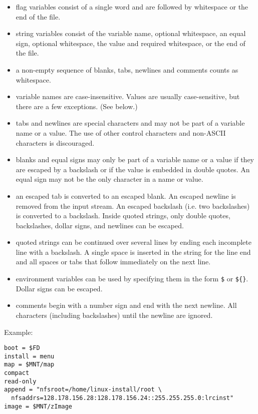 \begin{itemize}
  \item flag variables consist of a single word and are followed by
    whitespace or the end of the file.
  \item string variables consist of the variable name, optional whitespace,
    an equal sign, optional whitespace, the value and required whitespace,
    or the end of the file.
  \item a non-empty sequence of blanks, tabs, newlines and comments counts
    as whitespace.
  \item variable names are case-insensitive. Values are usually case-sensitive,
    but there are a few exceptions. (See below.)
  \item tabs and newlines are special characters and may not be part of a
    variable name or a value. The use of other control characters and
    non-ASCII characters is discouraged.
  \item blanks and equal signs may only be part of a variable name or a
    value if they are escaped by a backslash or if the value is embedded in
    double quotes. An equal sign may not be the only character in a name or
    value.
  \item an escaped tab is converted to an escaped blank. An escaped newline
    is removed from the input stream. An escaped backslash (i.e. two
    backslashes) is converted to a backslash. Inside quoted strings, only
    double quotes, backslashes, dollar signs, and newlines can be escaped.
  \item quoted strings can be continued over several lines by ending each
    incomplete line with a backslash. A single space is inserted in the
    string for the line end and all spaces or tabs that follow immediately
    on the next line.
  \item environment variables can be used by specifying them in the form
    \verb"$" or \verb"${"\verb"}". Dollar signs can
    be escaped.
  \item comments begin with a number sign and end with the next newline.
    All characters (including backslashes) until the newline are ignored.
\end{itemize}

Example:
\begin{verbatim}
boot = $FD
install = menu
map = $MNT/map
compact
read-only
append = "nfsroot=/home/linux-install/root \
  nfsaddrs=128.178.156.28:128.178.156.24::255.255.255.0:lrcinst"
image = $MNT/zImage
\end{verbatim}


